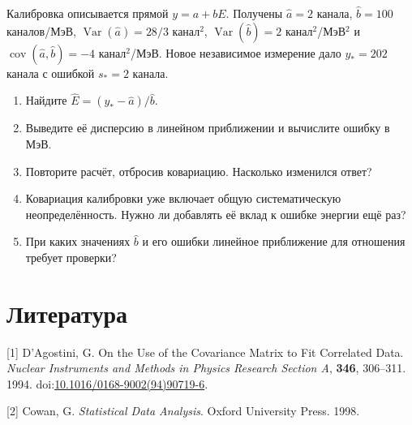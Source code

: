 \documentclass[
  russian,
  11pt,
  a4paper,
  open=any]{scrbook}
\newlength{\cslhangindent}
\newenvironment{CSLReferences}[2] %
 {\begin{list}{}{%
  \setlength{\itemindent}{0pt}
  \setlength{\leftmargin}{0pt}
  \setlength{\parsep}{0pt}
  \ifodd #1
   \setlength{\leftmargin}{\cslhangindent}
   \setlength{\itemindent}{-1\cslhangindent}
  \fi
  \setlength{\itemsep}{#2\baselineskip}}}
 {\end{list}}
\providecommand{\tightlist}{%
  \setlength{\itemsep}{0pt}\setlength{\parskip}{0pt}}
\begin{document}
\begin{semanticpdfbox}[colback=BookCoralSoft,borderline west={1.2mm}{0pt}{BookCoral}]

\par\nopagebreak[4]\vspace{1.2mm}

Калибровка описывается прямой \(y=a+bE\). Получены \(\widehat a=2\)
канала, \(\widehat b=100\) каналов/МэВ,
\(\operatorname{Var}(\widehat a)=28/3\) канал\(^2\),
\(\operatorname{Var}(\widehat b)=2\) канал\(^2\)/МэВ\(^2\) и
\(\operatorname{cov}(\widehat a,\widehat b)=-4\) канал\(^2\)/МэВ. Новое
независимое измерение дало \(y_*=202\) канала с ошибкой \(s_*=2\)
канала.

\begin{enumerate}
\def\labelenumi{\arabic{enumi}.}
\tightlist
\item
  Найдите \(\widehat E=(y_*-\widehat a)/\widehat b\).
\item
  Выведите её дисперсию в линейном приближении и вычислите ошибку в МэВ.
\item
  Повторите расчёт, отбросив ковариацию. Насколько изменился ответ?
\item
  Ковариация калибровки уже включает общую систематическую
  неопределённость. Нужно ли добавлять её вклад к ошибке энергии ещё
  раз?
\item
  При каких значениях \(\widehat b\) и его ошибки линейное приближение
  для отношения требует проверки?
\end{enumerate}

\end{semanticpdfbox}

\section*{Литература}\label{ux43bux438ux442ux435ux440ux430ux442ux443ux440ux430-11}


\protect{}\label{refs}
\begin{CSLReferences}{0}{0}
{[}1{]} D'Agostini, G. On the Use of the Covariance Matrix to Fit
Correlated Data. \emph{Nuclear Instruments and Methods in Physics
Research Section A}, \textbf{346}, 306--311. 1994.
doi:\href{https://doi.org/10.1016/0168-9002(94)90719-6}{10.1016/0168-9002(94)90719-6}.

{[}2{]} Cowan, G. \emph{Statistical Data Analysis}. Oxford University
Press. 1998.

\end{CSLReferences}
\end{document}
